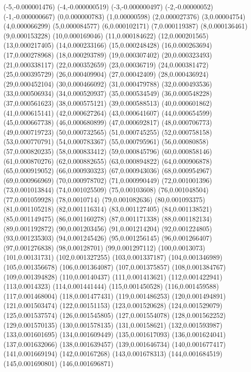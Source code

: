 (-5,-0.000001476)
(-4,-0.000000519)
(-3,-0.000000497)
(-2,-0.00000052)
(-1,-0.000000667)
(0,0.000000783)
(1,0.00000598)
(2,0.000027376)
(3,0.00004754)
(4,0.000066299)
(5,0.000084577)
(6,0.000102171)
(7,0.000119387)
(8,0.000136461)
(9,0.000153228)
(10,0.000169046)
(11,0.000184622)
(12,0.000201565)
(13,0.000217405)
(14,0.000233166)
(15,0.000248428)
(16,0.000263694)
(17,0.000278968)
(18,0.000293789)
(19,0.000307402)
(20,0.000323493)
(21,0.000338117)
(22,0.000352659)
(23,0.00036719)
(24,0.000381472)
(25,0.000395729)
(26,0.000409904)
(27,0.00042409)
(28,0.000436924)
(29,0.000452104)
(30,0.000466092)
(31,0.000479788)
(32,0.000493536)
(33,0.000506934)
(34,0.000520937)
(35,0.000534549)
(36,0.000548228)
(37,0.000561623)
(38,0.000575121)
(39,0.000588513)
(40,0.000601862)
(41,0.000615141)
(42,0.000627264)
(43,0.000641607)
(44,0.000654599)
(45,0.000667738)
(46,0.000680899)
(47,0.000692817)
(48,0.000706773)
(49,0.000719723)
(50,0.000732565)
(51,0.000745255)
(52,0.000758158)
(53,0.000770791)
(54,0.000783367)
(55,0.000795961)
(56,0.00080858)
(57,0.000820235)
(58,0.000833412)
(59,0.000845796)
(60,0.000858146)
(61,0.000870276)
(62,0.000882655)
(63,0.000894822)
(64,0.000906878)
(65,0.000919052)
(66,0.000930323)
(67,0.000943036)
(68,0.000954967)
(69,0.000966969)
(70,0.000978702)
(71,0.000990449)
(72,0.001001396)
(73,0.001013844)
(74,0.001025509)
(75,0.00103608)
(76,0.001048504)
(77,0.001059928)
(78,0.0010714)
(79,0.001082636)
(80,0.001093375)
(81,0.001105218)
(82,0.001116314)
(83,0.001127405)
(84,0.001138521)
(85,0.001149475)
(86,0.001160278)
(87,0.001171338)
(88,0.001182134)
(89,0.001192872)
(90,0.001203456)
(91,0.001214204)
(92,0.001224805)
(93,0.001235303)
(94,0.001245426)
(95,0.001256145)
(96,0.001266407)
(97,0.001276838)
(98,0.00128701)
(99,0.001297112)
(100,0.0013073)
(101,0.00131731)
(102,0.001327255)
(103,0.001337187)
(104,0.001346989)
(105,0.001356678)
(106,0.001364087)
(107,0.001375857)
(108,0.001384767)
(109,0.001394828)
(110,0.00140437)
(111,0.001413621)
(112,0.001422941)
(113,0.0014323)
(114,0.001441444)
(115,0.001450528)
(116,0.001459588)
(117,0.001468004)
(118,0.001477431)
(119,0.001486253)
(120,0.001494891)
(121,0.001503474)
(122,0.00151153)
(123,0.001520628)
(124,0.001529079)
(125,0.001537574)
(126,0.001545805)
(127,0.001554078)
(128,0.001562252)
(129,0.001570135)
(130,0.001578135)
(131,0.00158621)
(132,0.001593987)
(133,0.001601695)
(134,0.001609449)
(135,0.001617093)
(136,0.001624041)
(137,0.001632066)
(138,0.001639457)
(139,0.001646734)
(140,0.001677417)
(141,0.001669194)
(142,0.00167268)
(143,0.001678313)
(144,0.001684519)
(145,0.001690801)
(146,0.001696871)
